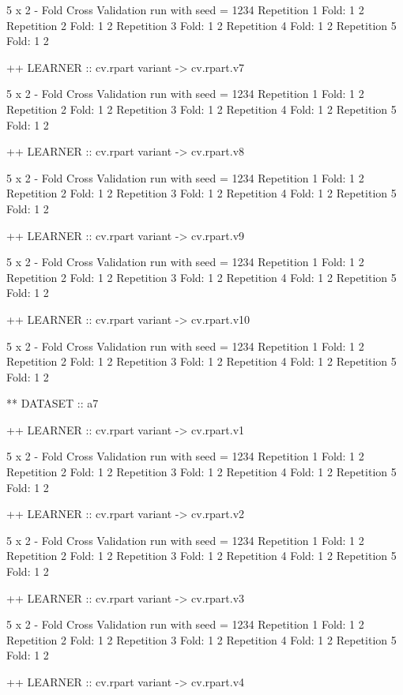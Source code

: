 \documentclass{article}
\begin{document}
\begin{Schunk}
\begin{Soutput}
 5 x 2 - Fold Cross Validation run with seed =  1234 
Repetition  1 
Fold:  1  2
Repetition  2 
Fold:  1  2
Repetition  3 
Fold:  1  2
Repetition  4 
Fold:  1  2
Repetition  5 
Fold:  1  2


++ LEARNER :: cv.rpart  variant ->  cv.rpart.v7 

 5 x 2 - Fold Cross Validation run with seed =  1234 
Repetition  1 
Fold:  1  2
Repetition  2 
Fold:  1  2
Repetition  3 
Fold:  1  2
Repetition  4 
Fold:  1  2
Repetition  5 
Fold:  1  2


++ LEARNER :: cv.rpart  variant ->  cv.rpart.v8 

 5 x 2 - Fold Cross Validation run with seed =  1234 
Repetition  1 
Fold:  1  2
Repetition  2 
Fold:  1  2
Repetition  3 
Fold:  1  2
Repetition  4 
Fold:  1  2
Repetition  5 
Fold:  1  2


++ LEARNER :: cv.rpart  variant ->  cv.rpart.v9 

 5 x 2 - Fold Cross Validation run with seed =  1234 
Repetition  1 
Fold:  1  2
Repetition  2 
Fold:  1  2
Repetition  3 
Fold:  1  2
Repetition  4 
Fold:  1  2
Repetition  5 
Fold:  1  2


++ LEARNER :: cv.rpart  variant ->  cv.rpart.v10 

 5 x 2 - Fold Cross Validation run with seed =  1234 
Repetition  1 
Fold:  1  2
Repetition  2 
Fold:  1  2
Repetition  3 
Fold:  1  2
Repetition  4 
Fold:  1  2
Repetition  5 
Fold:  1  2


** DATASET :: a7

++ LEARNER :: cv.rpart  variant ->  cv.rpart.v1 

 5 x 2 - Fold Cross Validation run with seed =  1234 
Repetition  1 
Fold:  1  2
Repetition  2 
Fold:  1  2
Repetition  3 
Fold:  1  2
Repetition  4 
Fold:  1  2
Repetition  5 
Fold:  1  2


++ LEARNER :: cv.rpart  variant ->  cv.rpart.v2 

 5 x 2 - Fold Cross Validation run with seed =  1234 
Repetition  1 
Fold:  1  2
Repetition  2 
Fold:  1  2
Repetition  3 
Fold:  1  2
Repetition  4 
Fold:  1  2
Repetition  5 
Fold:  1  2


++ LEARNER :: cv.rpart  variant ->  cv.rpart.v3 

 5 x 2 - Fold Cross Validation run with seed =  1234 
Repetition  1 
Fold:  1  2
Repetition  2 
Fold:  1  2
Repetition  3 
Fold:  1  2
Repetition  4 
Fold:  1  2
Repetition  5 
Fold:  1  2


++ LEARNER :: cv.rpart  variant ->  cv.rpart.v4 


\end{Soutput}
\end{Schunk}
\end{document}
